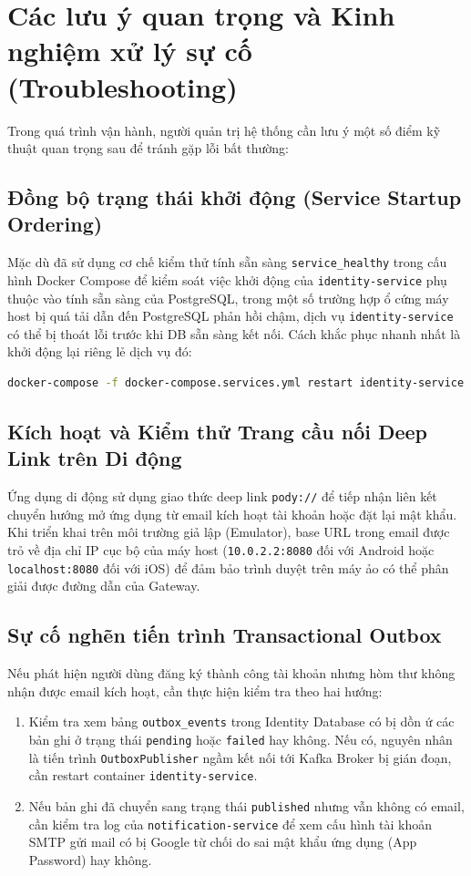 \documentclass[14pt,a4paper,oneside]{extreport}
\begin{document}
\section{Các lưu ý quan trọng và Kinh nghiệm xử lý sự cố (Troubleshooting)}
Trong quá trình vận hành, người quản trị hệ thống cần lưu ý một số điểm kỹ thuật quan trọng sau để tránh gặp lỗi bất thường:

\subsection{Đồng bộ trạng thái khởi động (Service Startup Ordering)}
Mặc dù đã sử dụng cơ chế kiểm thử tính sẵn sàng \texttt{service\allowbreak\_healthy} trong cấu hình Docker Compose để kiểm soát việc khởi động của \texttt{identity-\allowbreak service} phụ thuộc vào tính sẵn sàng của PostgreSQL, trong một số trường hợp ổ cứng máy host bị quá tải dẫn đến PostgreSQL phản hồi chậm, dịch vụ \texttt{identity-\allowbreak service} có thể bị thoát lỗi trước khi DB sẵn sàng kết nối. Cách khắc phục nhanh nhất là khởi động lại riêng lẻ dịch vụ đó:
\begin{lstlisting}[language=bash]
docker-compose -f docker-compose.services.yml restart identity-service
\end{lstlisting}

\subsection{Kích hoạt và Kiểm thử Trang cầu nối Deep Link trên Di động}
Ứng dụng di động sử dụng giao thức deep link \texttt{pody://} để tiếp nhận liên kết chuyển hướng mở ứng dụng từ email kích hoạt tài khoản hoặc đặt lại mật khẩu. Khi triển khai trên môi trường giả lập (Emulator), base URL trong email được trỏ về địa chỉ IP cục bộ của máy host (\texttt{10.0.2.2:8080} đối với Android hoặc \texttt{localhost:8080} đối với iOS) để đảm bảo trình duyệt trên máy ảo có thể phân giải được đường dẫn của Gateway.

\subsection{Sự cố nghẽn tiến trình Transactional Outbox}
Nếu phát hiện người dùng đăng ký thành công tài khoản nhưng hòm thư không nhận được email kích hoạt, cần thực hiện kiểm tra theo hai hướng:
\begin{enumerate}[leftmargin=1.5cm]
  \item Kiểm tra xem bảng \texttt{outbox\_events} trong Identity Database có bị dồn ứ các bản ghi ở trạng thái \texttt{pending} hoặc \texttt{failed} hay không. Nếu có, nguyên nhân là tiến trình \texttt{OutboxPublisher} ngầm kết nối tới Kafka Broker bị gián đoạn, cần restart container \texttt{identity-service}.
  \item Nếu bản ghi đã chuyển sang trạng thái \texttt{published} nhưng vẫn không có email, cần kiểm tra log của \texttt{notification-service} để xem cấu hình tài khoản SMTP gửi mail có bị Google từ chối do sai mật khẩu ứng dụng (App Password) hay không.
\end{enumerate}
\end{document}
